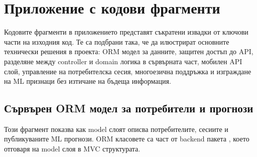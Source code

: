 \documentclass[12pt,a4paper]{article}
\newcommand{\code}[1]{\texttt{\detokenize{#1}}}
\begin{document}
\clearpage
\appendix
\section{Приложение с кодови фрагменти}

Кодовите фрагменти в приложението представят съкратени извадки от ключови части на изходния код. Те са подбрани така, че да илюстрират основните технически решения в проекта: ORM модел за данните, защитен достъп до API, разделяне между controller и domain логика в сървърната част, мобилен API слой, управление на потребителска сесия, многоезична поддръжка и изграждане на ML признаци без изтичане на бъдеща информация.
\subsection{Сървърен ORM модел за потребители и прогнози}

Този фрагмент показва как model слоят описва потребителите, сесиите и публикуваните ML прогнози. ORM класовете са част от backend пакета \code{app/models/}, което отговаря на model слоя в MVC структурата.
\end{document}
